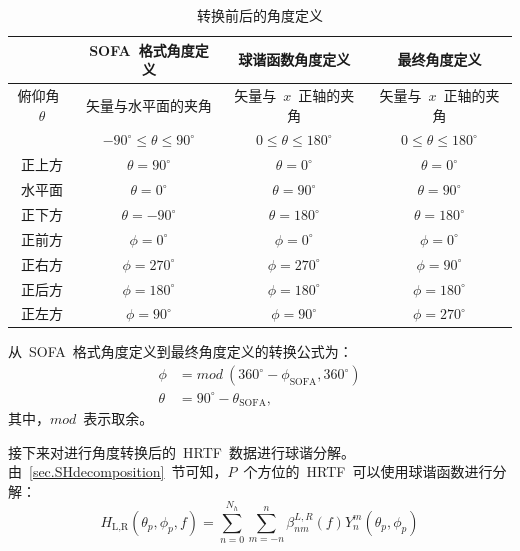 \begin{table}[H]
\centering
\caption{转换前后的角度定义}
\begin{tabular}{|c|c|c|c|}
\hline
   & SOFA~格式角度定义 & 球谐函数角度定义 & 最终角度定义 \\
\hline
俯仰角~$\theta$ & 矢量与水平面的夹角 &  矢量与~$x$~正轴的夹角& 矢量与~$x$~正轴的夹角  \\
 & $-90^{\circ} \leq \theta \leq 90^{\circ} $ & $0 \leq \theta \leq 180^{\circ} $ & $0 \leq \theta \leq 180^{\circ} $ \\
\hline
正上方 & $\theta = 90^{\circ}$ & $\theta = 0^{\circ}$ & $\theta = 0^{\circ}$ \\
水平面 & $\theta = 0^{\circ}$ & $\theta = 90^{\circ}$ & $\theta = 90^{\circ}$ \\
正下方 & $\theta = -90^{\circ}$ & $\theta = 180^{\circ}$ & $\theta = 180^{\circ}$ \\
\hline
正前方 & $\phi = 0^{\circ}$ & $\phi = 0^{\circ}$ & $\phi = 0^{\circ}$ \\
正右方 & $\phi = 270^{\circ}$ & $\phi = 270^{\circ}$ & $\phi = 90^{\circ}$ \\
正后方 & $\phi = 180^{\circ}$ & $\phi = 180^{\circ}$ & $\phi = 180^{\circ}$ \\
正左方 & $\phi = 90^{\circ}$ & $\phi = 90^{\circ}$ & $\phi = 270^{\circ}$ \\
\hline
\end{tabular}
\label{tab.angel_transform}
\end{table}

从~SOFA~格式角度定义到最终角度定义的转换公式为：
\begin{align}
\phi & = mod~\left( 360^{\circ}-\phi_{\text{SOFA}}, 360^{\circ} \right) \nonumber \\
\theta & =  90^{\circ} - \theta_{\text{SOFA}},
\end{align}
其中，$mod$~表示取余。

接下来对进行角度转换后的~HRTF~数据进行球谐分解。由~\ref{sec.SHdecomposition}~节可知，$P$~个方位的~HRTF~可以使用球谐函数进行分解：
\begin{equation}\label{HRTF_decomposition}
H_{\text{L,R}}(\theta_{p},\phi_{p},f)  = \sum_{n=0}^{N_{h}}\sum_{m=-n}^{n} \beta_{nm}^{L,R}(f)Y_{n}^{m}(\theta_{p},\phi_{p})
\end{equation}

